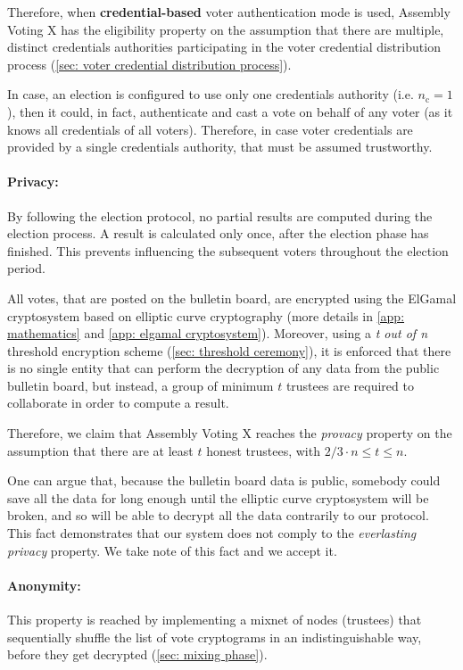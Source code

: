 Therefore, when \textbf{credential-based} voter authentication mode is used, Assembly Voting X has the eligibility property on the assumption that there are multiple, distinct credentials authorities participating in the voter credential distribution process (\cref{sec: voter credential distribution process}).

In case, an election is configured to use only one credentials authority (i.e. $n_\mathrm{c} = 1$), then it could, in fact, authenticate and cast a vote on behalf of any voter (as it knows all credentials of all voters). Therefore, in case voter credentials are provided by a single credentials authority, that must be assumed trustworthy.


\paragraph{Privacy:}
By following the election protocol, no partial results are computed during the election process. A result is calculated only once, after the election phase has finished. This prevents influencing the subsequent voters throughout the election period.

All votes, that are posted on the bulletin board, are encrypted using the ElGamal cryptosystem based on elliptic curve cryptography (more details in \cref{app: mathematics} and \cref{app: elgamal cryptosystem}). Moreover, using a \textit{t out of n} threshold encryption scheme (\cref{sec: threshold ceremony}), it is enforced that there is no single entity that can perform the decryption of any data from the public bulletin board, but instead, a group of minimum $t$ trustees are required to collaborate in order to compute a result.

Therefore, we claim that Assembly Voting X reaches the \textit{provacy} property on the assumption that there are at least $t$ honest trustees, with $2/3 \cdot n \leq t \leq n$.

One can argue that, because the bulletin board data is public, somebody could save all the data for long enough until the elliptic curve cryptosystem will be broken, and so will be able to decrypt all the data contrarily to our protocol. This fact demonstrates that our system does not comply to the \textit{everlasting privacy} property. We take note of this fact and we accept it.


\paragraph{Anonymity:}
This property is reached by implementing a mixnet of nodes (trustees) that sequentially shuffle the list of vote cryptograms in an indistinguishable way, before they get decrypted (\cref{sec: mixing phase}).

